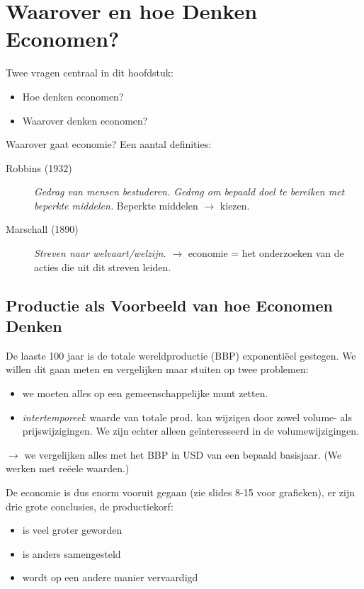 \section{Waarover en hoe Denken Economen?}
Twee vragen centraal in dit hoofdstuk:
\begin{itemize}
	\item Hoe denken economen?
    \item Waarover denken economen?
\end{itemize}

Waarover gaat economie? Een aantal definities:
\begin{description}
	\item[Robbins (1932)] \textit{Gedrag van mensen bestuderen. Gedrag om bepaald doel te bereiken met beperkte middelen.} Beperkte middelen $\rightarrow$ kiezen.
    \item[Marschall (1890)] \textit{Streven naar welvaart/welzijn.} $\rightarrow$ economie = het onderzoeken van de acties die uit dit streven leiden.
\end{description}

\subsection{Productie als Voorbeeld van hoe Economen Denken}
De laaste 100 jaar is de totale wereldproductie (BBP) exponenti\"{e}el gestegen. We willen dit gaan meten en vergelijken maar stuiten op twee problemen:
\begin{itemize}
	\item we moeten alles op een gemeenschappelijke munt zetten.
    \item \textit{intertemporeel}: waarde van totale prod. kan wijzigen door zowel volume- als prijswijzigingen. We zijn echter alleen ge\"{i}nteresseerd in de volumewijzigingen.
\end{itemize}
$\rightarrow$ we vergelijken alles met het BBP in USD van een bepaald basisjaar. (We werken met re\"{e}ele waarden.)

De economie is dus enorm vooruit gegaan (zie slides 8-15 voor grafieken), er zijn drie grote conclusies, de productiekorf:
\begin{itemize}
	\item is veel groter geworden
    \item is anders samengesteld
    \item wordt op een andere manier vervaardigd
\end{itemize}

